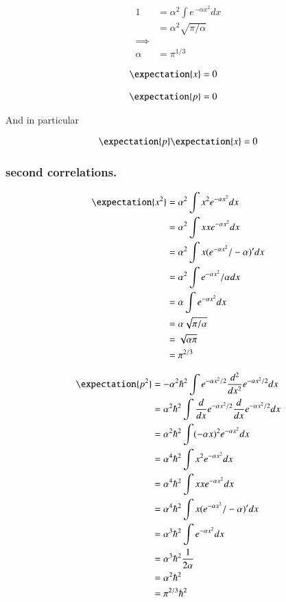 \documentclass{article}
\begin{document}
\begin{align*}
1 
&= \alpha^2 \int e^{-\alpha x^2} dx \\
&= \alpha^2 \sqrt{\pi/\alpha} \\
\implies \\
\alpha &= \pi^{1/3}
\end{align*}

\begin{align*}
\expectation{x} &= 0
\end{align*}

\begin{align*}
\expectation{p} &= 0
\end{align*}

And in particular

\begin{align*}
\expectation{p} \expectation{x} &= 0 \\
\end{align*}

\subsubsection{second correlations. }

\begin{align*}
\expectation{x^2} 
&= \alpha^2 \int x^2 e^{-\alpha x^2} dx \\
&= \alpha^2 \int x x e^{-\alpha x^2} dx \\
&= \alpha^2 \int x (e^{-\alpha x^2}/-\alpha)' dx \\
&= \alpha^2 \int e^{-\alpha x^2}/\alpha dx \\
&= \alpha \int e^{-\alpha x^2} dx \\
&= \alpha \sqrt{\pi/\alpha} \\
&= \sqrt{\alpha \pi} \\
&= \pi^{2/3} \\
\end{align*}

\begin{align*}
\expectation{p^2} 
&= -\alpha^2 \hbar^2 \int e^{-\alpha x^2/2} \frac{d^2}{dx^2} e^{-\alpha x^2/2} dx \\
&= \alpha^2 \hbar^2 \int \frac{d}{dx} e^{-\alpha x^2/2} \frac{d}{dx} e^{-\alpha x^2/2} dx \\
&= \alpha^2 \hbar^2 \int (-\alpha x)^2 e^{-\alpha x^2} dx \\
&= \alpha^4 \hbar^2 \int x^2 e^{-\alpha x^2} dx \\
&= \alpha^4 \hbar^2 \int x x e^{-\alpha x^2} dx \\
&= \alpha^4 \hbar^2 \int x (e^{-\alpha x^2}/-\alpha)' dx \\
&= \alpha^3 \hbar^2 \int e^{-\alpha x^2} dx \\
&= \alpha^3 \hbar^2 \inv{2\alpha} \\
&= \alpha^2 \hbar^2  \\
&= \pi^{2/3} \hbar^2 
\end{align*}
\end{document}
